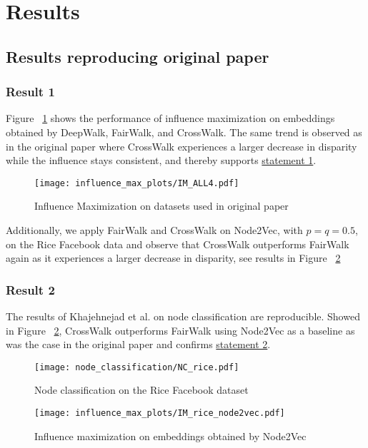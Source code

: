 \section{Results}
\label{sec:results}

\subsection{Results reproducing original paper}

\subsubsection{Result 1}
Figure ~\ref{fig:IMall4} shows the performance of influence maximization on embeddings obtained by DeepWalk, FairWalk, and CrossWalk. The same trend is observed as in the original paper where CrossWalk experiences a larger decrease in disparity while the influence stays consistent, and thereby supports \hyperref[claim1]{statement 1}.

\begin{figure}[H]
    \centering
    \texttt{[image: influence\_max\_plots/IM\_ALL4.pdf]}
    \caption{Influence Maximization on datasets used in original paper}
    \label{fig:IMall4}
\end{figure}

 Additionally, we apply FairWalk and CrossWalk on Node2Vec, with $p=q=0.5$, on the Rice Facebook data and observe that CrossWalk outperforms FairWalk again as it experiences a larger decrease in disparity, see results in Figure ~\ref{fig:IMnode2vec}
 \subsubsection{Result 2} 
The results of Khajehnejad et al. on node classification are reproducible. Showed in Figure ~\ref{fig:IMnode2vec}, CrossWalk outperforms FairWalk using Node2Vec as a baseline as was the case in the original paper and confirms \hyperref[claim2]{statement 2}.

\begin{figure}[H]
\centering
\begin{minipage}[H]{0.475\textwidth}
  \centering
  \texttt{[image: node\_classification/NC\_rice.pdf]}
  \caption{Node classification on the Rice Facebook dataset}
  \label{fig:IM3grouped}
\end{minipage}\hfill
\begin{minipage}[H]{0.475\textwidth}
  \centering
  \texttt{[image: influence\_max\_plots/IM\_rice\_node2vec.pdf]}
  \caption{Influence maximization on embeddings obtained by Node2Vec}
  \label{fig:IMnode2vec}
\end{minipage}
\end{figure}



